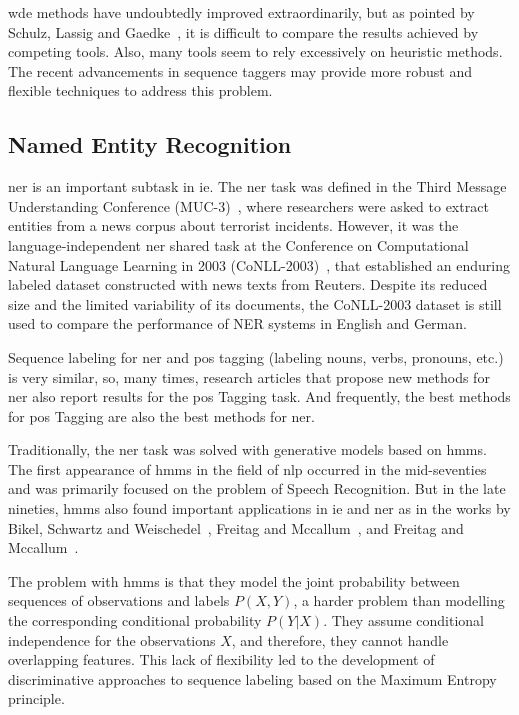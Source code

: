 \documentclass{nle}
\begin{document}
\gls{wde} methods have undoubtedly improved extraordinarily, but
as pointed by Schulz, Lassig and Gaedke~, it is difficult to compare the results 
achieved by competing tools. Also, many tools seem to rely excessively on heuristic methods.
The recent advancements in sequence taggers may provide more robust and flexible techniques
to address this problem.


\subsection{Named Entity Recognition}
\label{sec:ner}

\gls{ner} is an important subtask in \gls{ie}.
The \gls{ner} task was defined in the Third Message 
Understanding Conference (MUC-3)~\cite{Sundheim1991}, where researchers were asked to extract
entities from a news corpus about terrorist incidents. However, it was the 
language-independent \gls{ner} shared task at the Conference 
on Computational Natural Language Learning in 2003 ({CoNLL-2003})~\cite{KimSang2003},
that established an enduring labeled dataset constructed with news texts from Reuters.
Despite its reduced size and the limited variability of its documents, the {CoNLL-2003}
dataset is still used to compare the performance of NER systems in English and 
German. 

Sequence labeling for \gls{ner} and \gls{pos} tagging (labeling nouns, verbs, pronouns, etc.) 
is very similar, so, many times, research articles that propose new methods for \gls{ner}
also report results for the \gls{pos} Tagging task. And frequently, the best methods for 
\gls{pos} Tagging are also the best methods for \gls{ner}.

Traditionally, the \gls{ner} task was solved with generative models based on 
\gls{hmm}s. The first appearance of \gls{hmm}s in the
field of \gls{nlp} occurred in the mid-seventies and was
primarily focused on the problem of Speech Recognition. 
But in the late nineties, \gls{hmm}s also found important applications in \gls{ie}
and \gls{ner} as in the works by Bikel, Schwartz and Weischedel~, 
Freitag and Mccallum~, 
and Freitag and Mccallum~.

The problem with \gls{hmm}s is that they model the joint probability between 
sequences of observations and labels $ P(X, Y) $, a harder problem than modelling the corresponding 
conditional probability $ P(Y|X) $. They assume conditional independence for the observations $ X $, and
therefore, they cannot handle overlapping features. This lack of flexibility led to the 
development of discriminative approaches to sequence labeling based on the Maximum Entropy principle.
\end{document}
